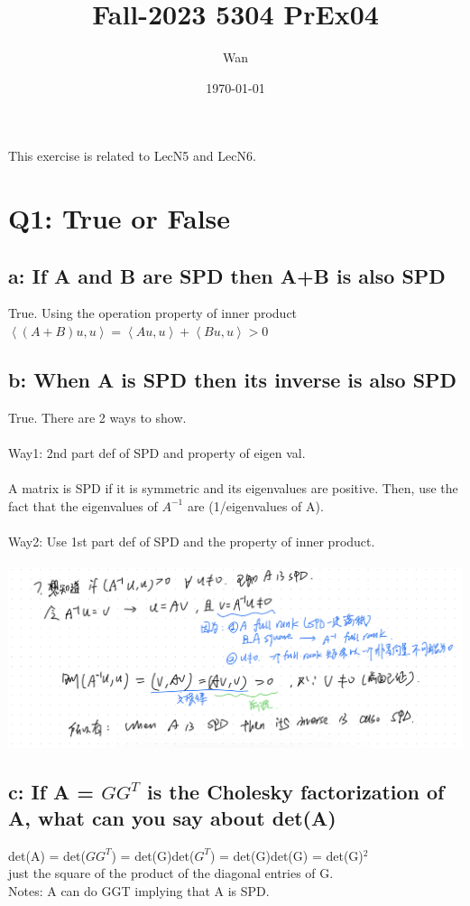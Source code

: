 \documentclass{article}
\begin{document}
\title{Fall-2023 5304 PrEx04}
\author{Wan}
\date{\today}
\maketitle

\noindent
This exercise is related to LecN5 and LecN6.

\section{Q1: True or False}
\subsection{a: If A and B are SPD then A+B is also SPD}
True. Using the operation property of inner product\\
$\left\langle (A+B)u,u\right\rangle = 
\left\langle Au,u\right\rangle + \left\langle Bu,u\right\rangle > 0
$

\subsection{b: When A is SPD then its inverse is also SPD}
True. There are 2 ways to show.\\
\\
Way1: 2nd part def of SPD and property of eigen val.\\
\\
\noindent
A matrix is SPD if it is symmetric and its eigenvalues are positive.
Then, use the fact that the eigenvalues of $A^{-1}$ are (1/eigenvalues of A).\\
\\
Way2: Use 1st part def of SPD and the property of inner product.\\
\\
\noindent
\includegraphics[width=1\linewidth]{pr4-1.jpeg}

\subsection{c: If A = $GG^T$ is the Cholesky factorization of A, what can you say about det(A)}
det(A) = det($GG^T$) = det(G)det($G^T$) = det(G)det(G) = det(G)$^2$\\
just the square of the product of the diagonal entries of G.\\
Notes: A can do GGT implying that A is SPD.
\end{document}
